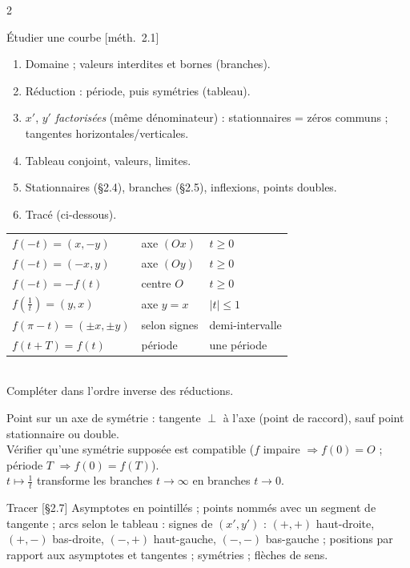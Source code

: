 \documentclass[a4paper,10pt]{article}
\newcommand{\livre}[1]{{\sffamily\scriptsize\color{Gris}[#1]}}
\begin{document}
\begin{multicols}{2}
\begin{METH}{Étudier une courbe \livre{méth.~2.1}}
\begin{enumerate}
\item Domaine ; valeurs interdites et bornes (branches).
\item Réduction : période, puis symétries (tableau).
\item $x'$, $y'$ \emph{factorisées} (même dénominateur) : stationnaires = zéros communs ; tangentes horizontales/verticales.
\item Tableau conjoint, valeurs, limites.
\item Stationnaires (§2.4), branches (§2.5), inflexions, points doubles.
\item Tracé (ci-dessous).
\end{enumerate}
\end{METH}

\begin{FORM}[SYMÉTRIES : chercher $\varphi$ avec $M(\varphi(t))=s(M(t))$]
\renewcommand{\arraystretch}{1.1}
\begin{tabular}{@{}lll@{}}
$f(-t)=(x,-y)$ & axe $(Ox)$ & $t\geq0$\\
$f(-t)=(-x,y)$ & axe $(Oy)$ & $t\geq0$\\
$f(-t)=-f(t)$ & centre $O$ & $t\geq0$\\
$f(\frac1t)=(y,x)$ & axe $y=x$ & $|t|\leq1$\\
$f(\pi-t)=(\pm x,\pm y)$ & selon signes & demi-intervalle\\
$f(t+T)=f(t)$ & période & une période
\end{tabular}\\
Compléter dans l'ordre inverse des réductions.
\end{FORM}

\begin{ASTU}
Point sur un axe de symétrie : tangente $\perp$ à l'axe (point de raccord), sauf point stationnaire ou double.\\
Vérifier qu'une symétrie supposée est compatible ($f$ impaire $\Rightarrow f(0)=O$ ; période $T$ $\Rightarrow f(0)=f(T)$).\\
$t\mapsto\frac1t$ transforme les branches $t\to\infty$ en branches $t\to0$.
\end{ASTU}

\begin{METH}{Tracer \livre{§2.7}}
Asymptotes en pointillés ; points nommés avec un segment de tangente ; arcs selon le tableau : signes de $(x',y')$ :
$(+,+)$ haut-droite, $(+,-)$ bas-droite, $(-,+)$ haut-gauche, $(-,-)$ bas-gauche ; positions par rapport aux asymptotes et
tangentes ; symétries ; flèches de sens.
\end{METH}


\end{multicols}
\end{document}
